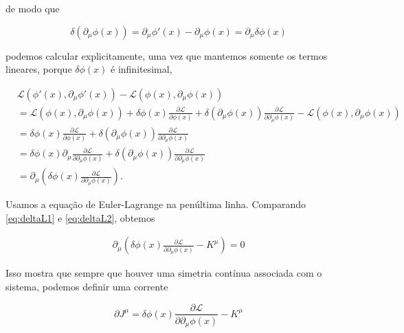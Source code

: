 de modo que

\begin{equation}
\delta (\partial_\mu \phi(x)) = \partial_\mu \phi' (x) - \partial_\mu \phi(x)  = \partial_\mu \delta \phi(x)
\end{equation}

podemos calcular explicitamente, uma vez que mantemos somente os termos lineares, porque $\delta \phi(x)$ é infinitesimal,

\begin{equation}
\begin{aligned}
&\mathcal{L} (\phi'(x), \partial_\mu \phi'(x)) - \mathcal{L} (\phi(x), \partial_\mu \phi(x)) \\
&= \mathcal{L} (\phi(x), \partial_\mu \phi(x)) + \delta \phi(x) \frac{\partial \mathcal{L}}{\partial \phi(x)} + \delta (\partial_\mu \phi (x)) \frac{\partial \mathcal{L}}{\partial \partial_\mu \phi(x)} - \mathcal{L} (\phi(x), \partial_\mu \phi(x)) \\
&= \delta \phi(x) \frac{\partial \mathcal{L}}{\partial \phi(x)} + \delta (\partial_\mu \phi (x)) \frac{\partial \mathcal{L}}{\partial \partial_\mu \phi(x)} \\
&= \delta \phi(x) \partial_\mu \frac{\partial \mathcal{L}}{\partial \partial_\mu  \phi(x)} + \delta (\partial_\mu \phi (x)) \frac{\partial \mathcal{L}}{\partial \partial_\mu \phi(x)} \\
&= \partial_\mu \left( \delta \phi (x) \frac{\partial \mathcal{L}}{\partial \partial_\mu \phi (x)} \right). \label{eq:deltaL2}
\end{aligned}
\end{equation}

Usamos a equação de Euler-Lagrange na penúltima linha. Comparando \eqref{eq:deltaL1} e \eqref{eq:deltaL2}, obtemos 

\begin{equation}
\begin{aligned}
\partial_\mu \left( \delta \phi (x) \frac{\partial \mathcal{L}}{\partial \partial_\mu \phi (x)} -  K^\mu \right) = 0 
\end{aligned}
\end{equation}

Isso mostra que sempre que houver uma simetria contínua associada com o sistema, podemos definir uma corrente

\begin{equation}
\partial J^\mu =  \delta \phi (x) \frac{\partial \mathcal{L}}{\partial \partial_\mu \phi (x)} -  K^\mu
\end{equation}

